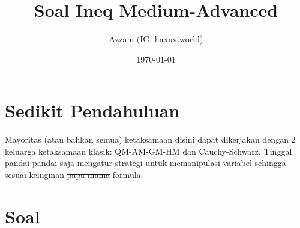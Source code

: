 \documentclass[12pt]{scrartcl}
\title{Soal Ineq Medium-Advanced}
\author{Azzam (IG: haxuv.world)}
\date{\today}
\begin{document}
\maketitle

\renewcommand*\contentsname{Daftar Isi}
\tableofcontents

\newpage
\section{Sedikit Pendahuluan}
Mayoritas (atau bahkan semua) ketaksamaan disini dapat dikerjakan dengan 2 keluarga ketaksamaan klasik: QM-AM-GM-HM dan Cauchy-Schwarz. Tinggal pandai-pandai saja mengatur strategi untuk memanipulasi variabel sehingga sesuai keinginan \sout{papa-mama} formula.

\section{Soal}
\end{document}
